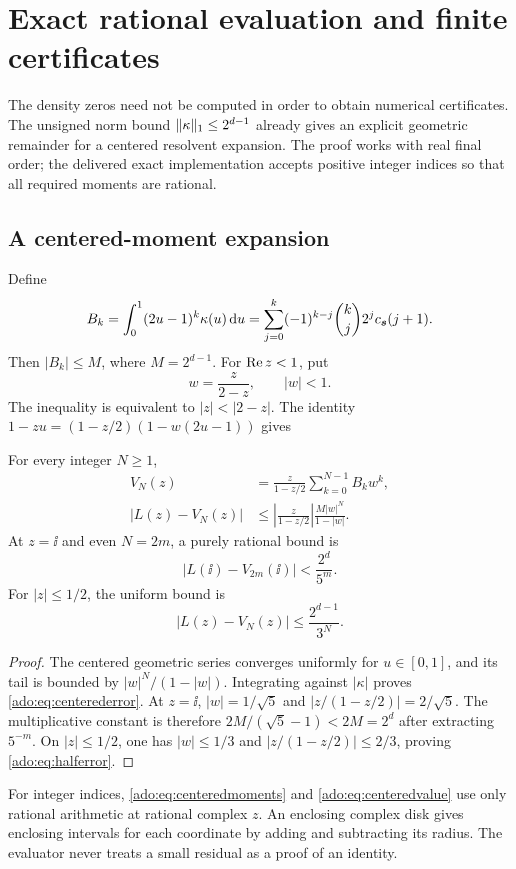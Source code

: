 \section{Exact rational evaluation and finite certificates}
\label{ado:sec:computation}
The density zeros need not be computed in order to obtain numerical
certificates. The unsigned norm bound $\lVert\kappa\rVert_1\le2^{d-1}$
already gives an explicit geometric remainder for a centered
resolvent expansion. The proof works with real final order; the delivered
exact implementation accepts positive integer indices so that all
required moments are rational.

\subsection{A centered-moment expansion}
Define
\begin{equation}\label{ado:eq:centeredmoments}
 B_k=\int_0^1(2u-1)^k\kappa(u)\,\mathrm d u
 =\sum_{j=0}^k(-1)^{k-j}\binom{k}{j}2^j c_{\boldsymbol{s}}(j+1).
\end{equation}
Then $|B_k|\le M$, where $M=2^{d-1}$. For $\operatorname{Re} z<1$, put
\[
 w=\frac{z}{2-z},\qquad |w|<1.
\]
The inequality is equivalent to $|z|<|2-z|$. The identity
$1-zu=(1-z/2)(1-w(2u-1))$ gives
\begin{theorem}
\label{ado:thm:evaluator}
For every integer $N\ge1$,
\begin{align}
 V_N(z)&=\frac{z}{1-z/2}\sum_{k=0}^{N-1}B_kw^k,
 \label{ado:eq:centeredvalue}\\
 |L(z)-V_N(z)|
 &\le\left|\frac{z}{1-z/2}\right|
          \frac{M|w|^N}{1-|w|}.
 \label{ado:eq:centerederror}
\end{align}
At $z=\ii$ and even $N=2m$, a purely rational bound is
\begin{equation}\label{ado:eq:gaussianerror}
 |L(\ii)-V_{2m}(\ii)|<\frac{2^d}{5^m}.
\end{equation}
For $|z|\le1/2$, the uniform bound is
\begin{equation}\label{ado:eq:halferror}
 |L(z)-V_N(z)|\le\frac{2^{d-1}}{3^N}.
\end{equation}
\end{theorem}
\begin{proof}
The centered geometric series converges uniformly for $u\in[0,1]$,
and its tail is bounded by $|w|^N/(1-|w|)$. Integrating against
$|\kappa|$ proves \eqref{ado:eq:centerederror}. At $z=\ii$,
$|w|=1/\sqrt5$ and $|z/(1-z/2)|=2/\sqrt5$. The multiplicative
constant is therefore $2M/(\sqrt5-1)<2M=2^d$ after extracting
$5^{-m}$. On $|z|\le1/2$, one has $|w|\le1/3$ and
$|z/(1-z/2)|\le2/3$, proving \eqref{ado:eq:halferror}.
\end{proof}
For integer indices, \eqref{ado:eq:centeredmoments} and
\eqref{ado:eq:centeredvalue} use only rational arithmetic at rational
complex $z$. An enclosing complex disk gives enclosing intervals for
each coordinate by adding and subtracting its radius. The evaluator
never treats a small residual as a proof of an identity.

